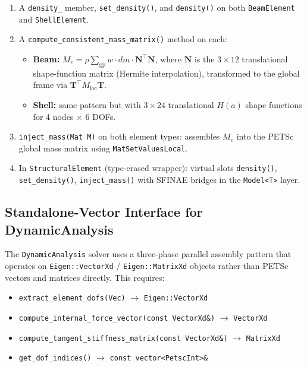 \begin{enumerate}
  \item A \texttt{density\_} member, \texttt{set\_density()}, and
        \texttt{density()} on both \texttt{BeamElement} and
        \texttt{ShellElement}.
  \item A \texttt{compute\_consistent\_mass\_matrix()} method on each:
        \begin{itemize}
          \item \textbf{Beam:} $\displaystyle M_e = \rho \sum_{\text{gp}} w \cdot dm \cdot
                              \mathbf{N}^\top \mathbf{N}$,
                where $\mathbf{N}$ is the $3 \times 12$ translational
                shape-function matrix (Hermite interpolation), transformed
                to the global frame via $\mathbf{T}^\top M_{\text{loc}} \mathbf{T}$.
          \item \textbf{Shell:} same pattern but with $3 \times 24$
                translational $H(a)$ shape functions for 4 nodes $\times$ 6 DOFs.
        \end{itemize}
  \item \texttt{inject\_mass(Mat M)} on both element types:
        assembles $M_e$ into the PETSc global mass matrix using
        \texttt{MatSetValuesLocal}.
  \item In \texttt{StructuralElement} (type-erased wrapper):
        virtual slots \texttt{density()}, \texttt{set\_density()},
        \texttt{inject\_mass()} with SFINAE bridges in the
        \texttt{Model<T>} layer.
\end{enumerate}

\subsection{Standalone-Vector Interface for DynamicAnalysis}

The \texttt{DynamicAnalysis} solver uses a three-phase parallel assembly
pattern that operates on \texttt{Eigen::VectorXd} / \texttt{Eigen::MatrixXd}
objects rather than PETSc vectors and matrices directly.  This requires:

\begin{itemize}
  \item \texttt{extract\_element\_dofs(Vec)} $\to$ \texttt{Eigen::VectorXd}
  \item \texttt{compute\_internal\_force\_vector(const VectorXd\&)} $\to$ \texttt{VectorXd}
  \item \texttt{compute\_tangent\_stiffness\_matrix(const VectorXd\&)} $\to$ \texttt{MatrixXd}
  \item \texttt{get\_dof\_indices()} $\to$ \texttt{const vector<PetscInt>\&}
\end{itemize}

